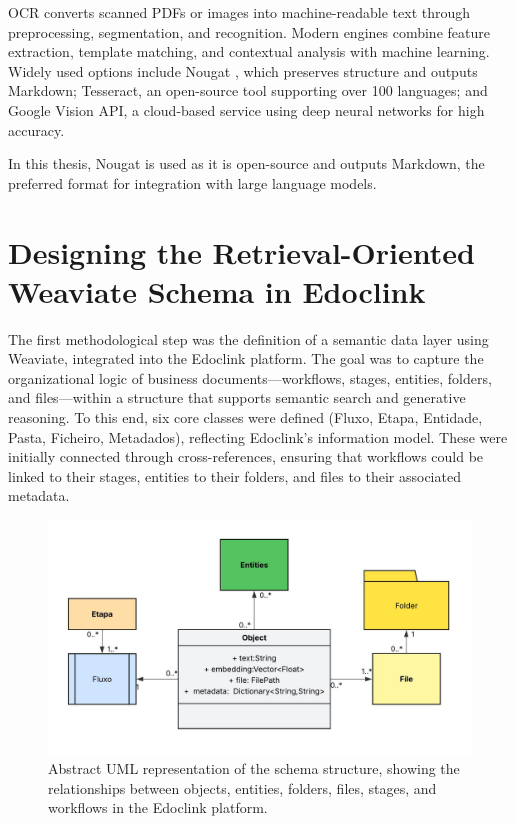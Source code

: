 OCR converts scanned PDFs or images into machine-readable text through preprocessing, segmentation, and recognition. Modern engines combine feature extraction, template matching, and contextual analysis with machine learning. Widely used options include Nougat \cite{blecher2023nougatneuralopticalunderstanding}, which preserves structure and outputs Markdown; Tesseract, an open-source tool supporting over 100 languages; and Google Vision API, a cloud-based service using deep neural networks for high accuracy.

In this thesis, Nougat is used as it is open-source and outputs Markdown, the preferred format for integration with large language models.

\section{Designing the Retrieval-Oriented Weaviate Schema in Edoclink}

The first methodological step was the definition of a semantic data layer using Weaviate, integrated into the Edoclink platform. The goal was to capture the organizational logic of business documents—workflows, stages, entities, folders, and files—within a structure that supports semantic search and generative reasoning. To this end, six core classes were defined (Fluxo, Etapa, Entidade, Pasta, Ficheiro, Metadados), reflecting Edoclink’s information model. These were initially connected through cross-references, ensuring that workflows could be linked to their stages, entities to their folders, and files to their associated metadata.

\begin{figure}[h!]
    \centering
    \includegraphics[width=1\linewidth]{Images/Classe UML.jpeg}
    \caption{Abstract UML representation of the schema structure, showing the relationships between objects, entities, folders, files, stages, and workflows in the Edoclink platform.}
    \label{fig:weaviate_class}
\end{figure}


